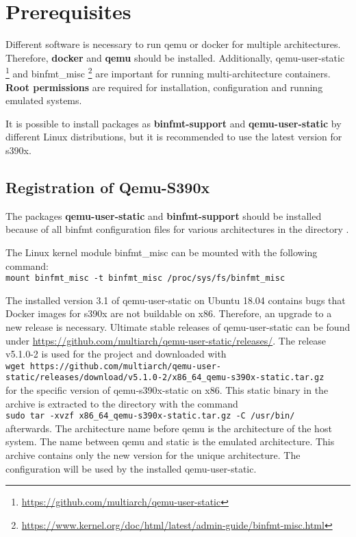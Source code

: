\chapter{Prerequisites}\label{ch:prequisites}


Different software is necessary to run qemu or docker for multiple architectures. Therefore, \textbf{docker} and \textbf{qemu} should be installed. Additionally, qemu-user-static \footnote{\url{https://github.com/multiarch/qemu-user-static}} and binfmt\_misc \footnote{\url{https://www.kernel.org/doc/html/latest/admin-guide/binfmt-misc.html}} are important for running multi-architecture containers. \\
\textbf{Root permissions} are required for installation, configuration and running emulated systems.

It is possible to install packages as \textbf{binfmt-support} and \textbf{qemu-user-static} by different Linux distributions, but it is recommended to use the latest version for s390x. \\

\section{Registration of Qemu-S390x}\label{Qemu-S390-Registration}

The packages \textbf{qemu-user-static} and \textbf{binfmt-support} should be installed because of all binfmt configuration files for various architectures in the directory  \cite{Yang2019}. 

The Linux kernel module binfmt\_misc can be mounted with the following command: \\
\lstinline!mount binfmt_misc -t binfmt_misc /proc/sys/fs/binfmt_misc!

The installed version 3.1 of qemu-user-static on Ubuntu 18.04 contains bugs that Docker images for s390x are not buildable on x86. Therefore, an upgrade to a new release is necessary.
Ultimate stable releases of qemu-user-static can be found under \url{https://github.com/multiarch/qemu-user-static/releases/}. The release v5.1.0-2 is used for the project and downloaded with \\
\lstinline!wget https://github.com/multiarch/qemu-user-static/releases/download/v5.1.0-2/x86_64_qemu-s390x-static.tar.gz! \\ 
for the specific version of qemu-s390x-static on x86. This static binary in the archive is extracted to the directory  with the command \\ 
\lstinline!sudo tar -xvzf x86_64_qemu-s390x-static.tar.gz -C /usr/bin/! \\
afterwards. 
The architecture name before qemu is the architecture of the host system. The name between qemu and static is the emulated architecture. This archive contains only the new version for the unique architecture. The configuration will be used by the installed qemu-user-static.\\


